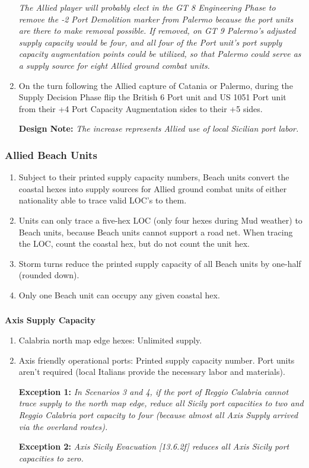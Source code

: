\begin{enumerate}[label=\alph*.]
    \textit{The Allied player will probably elect in the GT 8 Engineering Phase to remove the -2 Port Demolition marker from Palermo because the port units are there to make removal possible. If removed, on GT 9 Palermo's adjusted supply capacity would be four, and all four of the Port unit's port supply capacity augmentation points could be utilized, so that Palermo could serve as a supply source for eight Allied ground combat units.}
    
    \item On the turn following the Allied capture of Catania or Palermo, during the Supply Decision Phase flip the British 6 Port unit and US 1051 Port unit from their +4 Port Capacity Augmentation sides to their +5 sides.
    
    \textbf{Design Note: } \textit{The increase represents Allied use of local Sicilian port labor.}
\end{enumerate}

\subsubsection{Allied Beach Units}
\begin{enumerate}[label=\alph*.]
    \item Subject to their printed supply capacity numbers, Beach units convert the coastal hexes into supply sources for Allied ground combat units of either nationality able to trace valid LOC's to them.
    \item Units can only trace a five-hex LOC (only four hexes during Mud weather) to Beach units, because Beach units cannot support a road net. When tracing the LOC, count the coastal hex, but do not count the unit hex.
    \item Storm turns reduce the printed supply capacity of all Beach units by one-half (rounded down).
    \item Only one Beach unit can occupy any given coastal hex.
\end{enumerate}

\subsubsection{}\textbf{Axis Supply Capacity}
\begin{enumerate}[label=\alph*.]
    \item Calabria north map edge hexes: Unlimited supply.
    \item Axis friendly operational ports: Printed supply capacity number. Port units aren't required (local Italians provide the necessary labor and materials).
    
    \textbf{Exception 1:} \textit{ In Scenarios 3 and 4, if the port of Reggio Calabria cannot trace supply to the north map edge, reduce all Sicily port capacities to two and Reggio Calabria port capacity to four (because almost all Axis Supply arrived via the overland routes).}
    
    \textbf{Exception 2:} \textit{Axis Sicily Evacuation [13.6.2f] reduces all Axis Sicily port capacities to zero.}
\end{enumerate}

